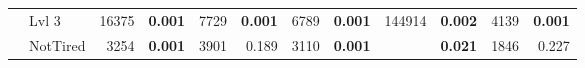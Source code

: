 \begin{table*}
{\begin{tabular}{cl|rr|rr|rr|rr|rr|}
                & Lvl 3        & 16375                   & \bf 0.001                  & 7729                      & \bf 0.001                     & 6789                   & \bf 0.001                 & 144914                  & \bf 0.002                    & 4139                         & \bf 0.001             \\
                & NotTired     & 3254                    & \bf 0.001                  & 3901                      & 0.189                         &  3110             & \bf 0.001                 & \best 912               & \bf 0.021                    & 1846                         & 0.227                      \\

            \bottomrule
        \end{tabular}
    }


\end{table*}
